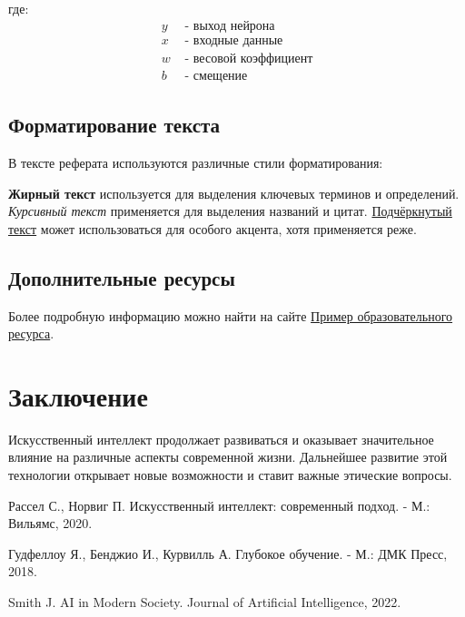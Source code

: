 \documentclass[14pt]{extreport}
\begin{document}
где:
\begin{align}
y & \text{ - выход нейрона} \nonumber \\
x & \text{ - входные данные} \nonumber \\
w & \text{ - весовой коэффициент} \nonumber \\
b & \text{ - смещение} \nonumber
\end{align}

\section{Форматирование текста}
В тексте реферата используются различные стили форматирования:

\textbf{Жирный текст} используется для выделения ключевых терминов и определений. \textit{Курсивный текст} применяется для выделения названий и цитат. \underline{Подчёркнутый текст} может использоваться для особого акцента, хотя применяется реже.

\section{Дополнительные ресурсы}
Более подробную информацию можно найти на сайте \href{https://example.com}{Пример образовательного ресурса}.

\chapter{Заключение}
Искусственный интеллект продолжает развиваться и оказывает значительное влияние на различные аспекты современной жизни. Дальнейшее развитие этой технологии открывает новые возможности и ставит важные этические вопросы.

\begin{thebibliography}{9}
\item Рассел С., Норвиг П. Искусственный интеллект: современный подход. - М.: Вильямс, 2020.
\item Гудфеллоу Я., Бенджио И., Курвилль А. Глубокое обучение. - М.: ДМК Пресс, 2018.
\item Smith J. AI in Modern Society. Journal of Artificial Intelligence, 2022.
\end{thebibliography}
\end{document}
